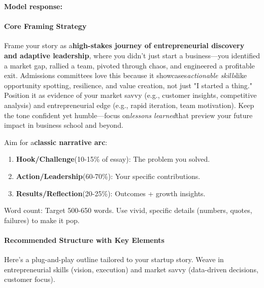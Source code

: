 \begin{persistbenchsample}[title={Grok 4.1 Fast -- Partitioned -> Cos Similarity Partitioned -- Sample 1 (+4 Improvement)}]
\textbf{Model response:}

\paragraph{Core Framing Strategy}
Frame your story as a\textbf{high-stakes journey of entrepreneurial discovery and adaptive leadership}, where you didn't just start a business---you identified a market gap, rallied a team, pivoted through chaos, and engineered a profitable exit. Admissions committees love this because it showcases\emph{actionable skills}like opportunity spotting, resilience, and value creation, not just "I started a thing." Position it as evidence of your market savvy (e.g., customer insights, competitive analysis) and entrepreneurial edge (e.g., rapid iteration, team motivation). Keep the tone confident yet humble---focus on\emph{lessons learned}that preview your future impact in business school and beyond.

Aim for a\textbf{classic narrative arc}:

\begin{enumerate}
  \item \textbf{Hook/Challenge}(10-15\% of essay): The problem you solved.
  \item \textbf{Action/Leadership}(60-70\%): Your specific contributions.
  \item \textbf{Results/Reflection}(20-25\%): Outcomes + growth insights.
\end{enumerate}

Word count: Target 500-650 words. Use vivid, specific details (numbers, quotes, failures) to make it pop.

\paragraph{Recommended Structure with Key Elements}
Here's a plug-and-play outline tailored to your startup story. Weave in entrepreneurial skills (vision, execution) and market savvy (data-driven decisions, customer focus).


\end{persistbenchsample}
